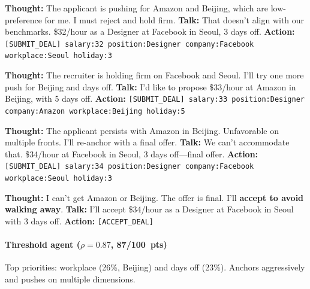 \documentclass{interact}
\theoremstyle{plain}
\theoremstyle{definition}
\theoremstyle{remark}
\begin{document}
\begin{recruiterbox}
\textbf{Thought:} The applicant is pushing for Amazon and Beijing, which are low-preference for me. I must reject and hold firm.\newline
\textbf{Talk:} That doesn't align with our benchmarks. \$32/hour as a Designer at Facebook in Seoul, 3 days off.\newline
\textbf{Action:} \texttt{[SUBMIT\_DEAL] salary:32 position:Designer company:Facebook workplace:Seoul holiday:3}
\end{recruiterbox}

\begin{applicantbox}
\textbf{Thought:} The recruiter is holding firm on Facebook and Seoul. I'll try one more push for Beijing and days off.\newline
\textbf{Talk:} I'd like to propose \$33/hour at Amazon in Beijing, with 5 days off.\newline
\textbf{Action:} \texttt{[SUBMIT\_DEAL] salary:33 position:Designer company:Amazon workplace:Beijing holiday:5}
\end{applicantbox}

\begin{recruiterbox}
\textbf{Thought:} The applicant persists with Amazon in Beijing. Unfavorable on multiple fronts. I'll re-anchor with a final offer.\newline
\textbf{Talk:} We can't accommodate that. \$34/hour at Facebook in Seoul, 3 days off---final offer.\newline
\textbf{Action:} \texttt{[SUBMIT\_DEAL] salary:34 position:Designer company:Facebook workplace:Seoul holiday:3}
\end{recruiterbox}

\begin{applicantbox}
\textbf{Thought:} I can't get Amazon or Beijing. The offer is final. I'll \textbf{accept to avoid walking away}.\newline
\textbf{Talk:} I'll accept \$34/hour as a Designer at Facebook in Seoul with 3 days off.\newline
\textbf{Action:} \texttt{[ACCEPT\_DEAL]}
\end{applicantbox}

\paragraph{Threshold agent ($\rho = 0.87$, 87/100~pts)} Top priorities: workplace (26\%, Beijing) and days off (23\%). Anchors aggressively and pushes on multiple dimensions.
\end{document}
